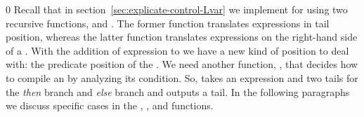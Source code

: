 \documentclass[7x10]{TimesAPriori_MIT}%
\def\racketEd{0}
\def\edition{1}
\numberwithin{theorem}{chapter}
\numberwithin{definition}{chapter}
\numberwithin{equation}{chapter}
\begin{document}
{\if\edition\racketEd        
%
Recall that in section~\ref{sec:explicate-control-Lvar} we implement
 for \LangVarANF{} using two recursive
functions,  and .  The
former function translates expressions in tail position, whereas the
latter function translates expressions on the right-hand side of a
. With the addition of  expression to \LangIfANF{} we
have a new kind of position to deal with: the predicate position of
the . We need another function, , that
decides how to compile an  by analyzing its condition.  So,
 takes an \LangIfANF{} expression and two
\LangCIf{} tails for the \emph{then} branch and \emph{else} branch
and outputs a tail.  In the following paragraphs we discuss specific
cases in the , , and
 functions.
%
\fi}
%
\end{document}
